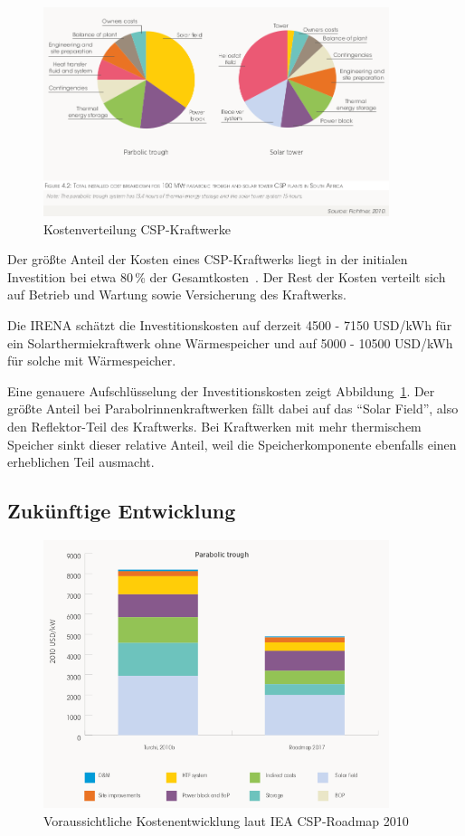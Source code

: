\begin{figure}
	\centering
	\includegraphics[width=0.9\textwidth]{kostenverteilung.png}
	\caption{Kostenverteilung CSP-Kraftwerke}
	\label{fig:kostenverteilung}
\end{figure}

Der größte Anteil der Kosten eines CSP-Kraftwerks liegt in der initialen Investition bei etwa 80\,\% der Gesamtkosten~\cite{irena2012}. Der Rest der Kosten verteilt sich auf Betrieb und Wartung sowie Versicherung des Kraftwerks.

Die IRENA schätzt die Investitionskosten auf derzeit 4500 - 7150 USD/kWh für ein Solarthermiekraftwerk ohne Wärmespeicher und auf 5000 - 10500 USD/kWh für solche mit Wärmespeicher.

Eine genauere Aufschlüsselung der Investitionskosten zeigt Abbildung~\ref{fig:kostenverteilung}. Der größte Anteil bei Parabolrinnenkraftwerken fällt dabei auf das "`Solar Field"', also den Reflektor-Teil des Kraftwerks. Bei Kraftwerken mit mehr thermischem Speicher sinkt dieser relative Anteil, weil die Speicherkomponente ebenfalls einen erheblichen Teil ausmacht.

\subsection{Zukünftige Entwicklung}

\begin{figure}
	\centering
	\includegraphics[width=0.9\textwidth]{kostenentwicklung1.png}
	\caption{Voraussichtliche Kostenentwicklung laut IEA CSP-Roadmap 2010}
	\label{fig:kostenentwicklung1}
\end{figure}

